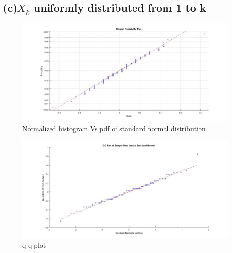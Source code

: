 \documentclass[a4paper,11pt]{article}
\begin{document}
\subsection*{(c)\quad $X_k$ uniformly distributed from 1 to k}
\begin{figure}[h]
   \hspace*{-4cm}
    \includegraphics[scale=0.4]{q2_c_1}
    \caption{Normalized histogram Vs pdf of standard normal distribution}\label{fig:q2_c_1}
\end{figure}
\begin{figure}[h]
   \hspace*{-4cm}
    \includegraphics[scale=0.4]{q2_c_2}
    \caption{q-q plot}\label{fig:q2_c_2}
\end{figure}
\newpage
\clearpage
\end{document}
